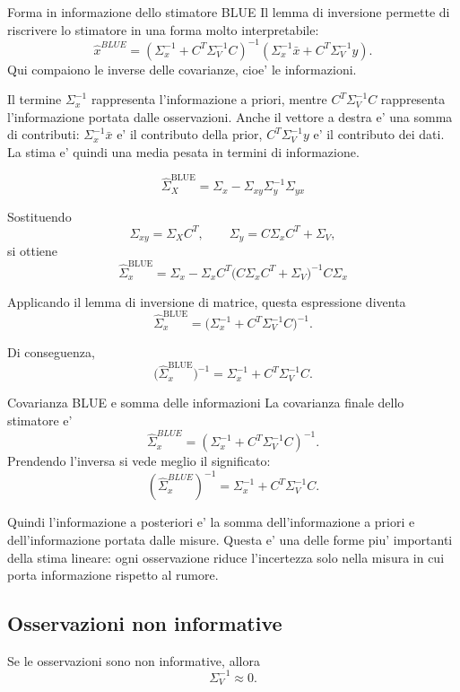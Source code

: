 \documentclass[11pt,a4paper]{article}
\begin{document}
\begin{spiegazione}{Forma in informazione dello stimatore BLUE}
Il lemma di inversione permette di riscrivere lo stimatore in una forma molto interpretabile:
\[
\hat x^{BLUE}
=
(\Sigma_x^{-1}+C^T\Sigma_V^{-1}C)^{-1}
(\Sigma_x^{-1}\bar x+C^T\Sigma_V^{-1}y).
\]
Qui compaiono le inverse delle covarianze, cioe' le informazioni.

Il termine $\Sigma_x^{-1}$ rappresenta l'informazione a priori, mentre $C^T\Sigma_V^{-1}C$ rappresenta l'informazione portata dalle osservazioni. Anche il vettore a destra e' una somma di contributi: $\Sigma_x^{-1}\bar x$ e' il contributo della prior, $C^T\Sigma_V^{-1}y$ e' il contributo dei dati. La stima e' quindi una media pesata in termini di informazione.
\end{spiegazione}

\[
\hat\Sigma_X^{\mathrm{BLUE}}
=
\Sigma_x-\Sigma_{xy}\Sigma_y^{-1}\Sigma_{yx}
\]

Sostituendo
\[
\Sigma_{xy}=\Sigma_X C^T,
\qquad
\Sigma_y=C\Sigma_x C^T+\Sigma_V,
\]
si ottiene
\[
\hat\Sigma_x^{\mathrm{BLUE}}
=
\Sigma_x-\Sigma_x C^T\bigl(C\Sigma_xC^T+\Sigma_V\bigr)^{-1}C\Sigma_x
\]

Applicando il lemma di inversione di matrice, questa espressione diventa
\[
\hat\Sigma_x^{\mathrm{BLUE}}
=
\bigl(\Sigma_x^{-1}+C^T\Sigma_V^{-1}C\bigr)^{-1}.
\]

Di conseguenza,
\[
\bigl(\hat\Sigma_x^{\mathrm{BLUE}}\bigr)^{-1}
=
\Sigma_x^{-1}+C^T\Sigma_V^{-1}C.
\]

\begin{spiegazione}{Covarianza BLUE e somma delle informazioni}
La covarianza finale dello stimatore e'
\[
\hat\Sigma_x^{BLUE}
=
(\Sigma_x^{-1}+C^T\Sigma_V^{-1}C)^{-1}.
\]
Prendendo l'inversa si vede meglio il significato:
\[
(\hat\Sigma_x^{BLUE})^{-1}
=
\Sigma_x^{-1}+C^T\Sigma_V^{-1}C.
\]

Quindi l'informazione a posteriori e' la somma dell'informazione a priori e dell'informazione portata dalle misure. Questa e' una delle forme piu' importanti della stima lineare: ogni osservazione riduce l'incertezza solo nella misura in cui porta informazione rispetto al rumore.
\end{spiegazione}

\subsection*{Osservazioni non informative}

Se le osservazioni sono non informative, allora
\[
\Sigma_V^{-1}\approx 0.
\]
\end{document}
